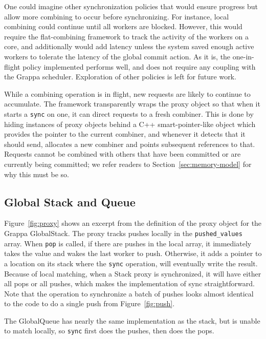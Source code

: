One could imagine other synchronization policies that would ensure progress but allow more combining to occur before synchronizing. For instance, local combining could continue until all workers are blocked. However, this would require the flat-combining framework to track the activity of the workers on a core, and additionally would add latency unless the system saved enough active workers to tolerate the latency of the global commit action. As it is, the one-in-flight policy implemented performs well, and does not require any coupling with the Grappa scheduler. Exploration of other policies is left for future work.

While a combining operation is in flight, new requests are likely to continue to accumulate. The framework transparently wraps the proxy object so that when it starts a \texttt{sync} on one, it can direct requests to a fresh combiner.
This is done by hiding instances of proxy objects behind a C++ smart-pointer-like object which provides the pointer to the current combiner, and whenever it detects that it should send, allocates a new combiner and points subsequent references to that.
Requests cannot be combined with others that have been committed or are currently being committed; we refer
 readers to Section~\ref{sec:memory-model} for why this must be so.

\subsection{Global Stack and Queue}
Figure~\ref{fig:proxy} shows an excerpt from the definition of the proxy object for the Grappa GlobalStack. The proxy tracks pushes locally in the \texttt{pushed\_values} array. When \texttt{pop} is called, if there are pushes in the local array, it immediately takes the value and wakes the last worker to push. Otherwise, it adds a pointer to a location on its stack where the \texttt{sync} operation, will eventually write the result. Because of local matching, when a Stack proxy is synchronized, it will have either all pops or all pushes, which makes the implementation of sync straightforward. Note that the operation to synchronize a batch of pushes looks almost identical to the code to do a single push from Figure~\ref{fig:push}.

The GlobalQueue has nearly the same implementation as the stack, but is unable to match locally, so \texttt{sync} first does the pushes, then does the pops.

